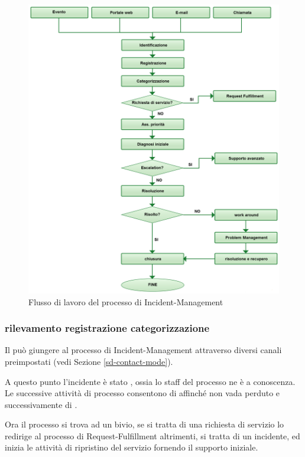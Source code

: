 \begin{figure}[htbp]
\centering
\includegraphics[scale=0.25]{Images/Diagrams/IncidentManagement.png}
\caption{Flusso di lavoro del processo di \ac{Incident-Management}}
\label{prc-incident-activities-img}
\end{figure}

\subsubsection[Rilevamento Registrazione Categorizzazione]{rilevamento registrazione categorizzazione}
Il  può giungere al processo di \ac{Incident-Management} attraverso diversi canali preimpostati (vedi Sezione \ref{sd-contact-mode}).

A questo punto l'incidente è stato , ossia lo staff del processo ne è a conoscenza. Le successive attività di processo consentono di  affinché non vada perduto e successivamente di .

Ora il processo si trova ad un bivio, se si tratta di una richiesta di servizio lo redirige al processo di \ac{Request-Fulfillment} altrimenti, si tratta di un incidente, ed inizia le attività di ripristino del servizio fornendo il supporto iniziale.

